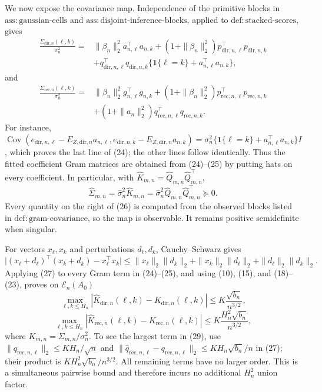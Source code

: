 We now expose the covariance map.  Independence of the primitive blocks in \(\mathrm{ass{:}gaussian\mbox{-}cells}\) and \(\mathrm{ass{:}disjoint\mbox{-}inference\mbox{-}blocks}\), applied to \(\mathrm{def{:}stacked\mbox{-}scores}\), gives
\[
\begin{aligned}
 \frac{\Sigma_{\mathrm{dir},n}(\ell,k)}{\sigma_n^2}
={}&\|\beta_n\|_2^2a_{n,\ell}^{\top}a_{n,k}
 +(1+\|\beta_n\|_2^2)p_{\mathrm{dir},n,\ell}^{\top}p_{\mathrm{dir},n,k}\\
 &+q_{\mathrm{dir},n,\ell}^{\top}q_{\mathrm{dir},n,k}
   \{\mathbf 1\{\ell=k\}+a_{n,\ell}^{\top}a_{n,k}\},
\end{aligned}
 \tag{24}
\]
and
\[
\begin{aligned}
 \frac{\Sigma_{\mathrm{rec},n}(\ell,k)}{\sigma_n^2}
={}&\|\beta_n\|_2^2g_{n,\ell}^{\top}g_{n,k}
 +(1+\|\beta_n\|_2^2)p_{\mathrm{rec},n,\ell}^{\top}p_{\mathrm{rec},n,k}\\
 &+(1+\|a_n\|_2^2)q_{\mathrm{rec},n,\ell}^{\top}q_{\mathrm{rec},n,k}.
\end{aligned}
 \tag{25}
\]
For instance,
\(\operatorname{Cov}(e_{\mathrm{dir},n,\ell}-E_{Z,\mathrm{dir},n}a_{n,\ell},
e_{\mathrm{dir},n,k}-E_{Z,\mathrm{dir},n}a_{n,k})
=\sigma_n^2\{\mathbf 1\{\ell=k\}+a_{n,\ell}^{\top}a_{n,k}\}I\), which proves the last line of (24); the other lines follow identically.  Thus the fitted coefficient Gram matrices are obtained from (24)--(25) by putting hats on every coefficient.  In particular, with \(\widehat K_{m,n}=\widehat Q_{m,n}\widehat Q_{m,n}^{\top}\),
\[
 \widehat\Sigma_{m,n}=\widehat\sigma_n^2\widehat K_{m,n}
 =\widehat\sigma_n^2\widehat Q_{m,n}\widehat Q_{m,n}^{\top}\succeq0.
 \tag{26}
\]
Every quantity on the right of (26) is computed from the observed blocks listed in \(\mathrm{def{:}gram\mbox{-}covariance}\), so the map is observable.  It remains positive semidefinite when singular.

For vectors \(x_\ell,x_k\) and perturbations \(d_\ell,d_k\), Cauchy--Schwarz gives
\[
 \bigl|(x_\ell+d_\ell)^\top(x_k+d_k)-x_\ell^\top x_k\bigr|
 \le\|x_\ell\|_2\|d_k\|_2+
      \|x_k\|_2\|d_\ell\|_2+
      \|d_\ell\|_2\|d_k\|_2.
 \tag{27}
\]
Applying (27) to every Gram term in (24)--(25), and using (10), (15), and (18)--(23), proves on \(\mathcal E_n(A_0)\)
\[
 \max_{\ell,k\le H_n}
 |\widehat K_{\mathrm{dir},n}(\ell,k)-K_{\mathrm{dir},n}(\ell,k)|
 \le K\frac{\sqrt{b_n}}{n^{3/2}},
 \tag{28}
\]
\[
 \max_{\ell,k\le H_n}
 |\widehat K_{\mathrm{rec},n}(\ell,k)-K_{\mathrm{rec},n}(\ell,k)|
 \le K\frac{H_n^2\sqrt{b_n}}{n^{3/2}},
 \tag{29}
\]
where \(K_{m,n}=\Sigma_{m,n}/\sigma_n^2\).  To see the largest term in (29), use
\(\|q_{\mathrm{rec},n,\ell}\|_2\le KH_n/\sqrt n\) and
\(\|\widehat q_{\mathrm{rec},n,\ell}-q_{\mathrm{rec},n,\ell}\|_2
\le KH_n\sqrt{b_n}/n\) in (27); their product is
\(KH_n^2\sqrt{b_n}/n^{3/2}\).  All remaining terms have no larger order.  This is a simultaneous pairwise bound and therefore incurs no additional \(H_n^2\) union factor.


